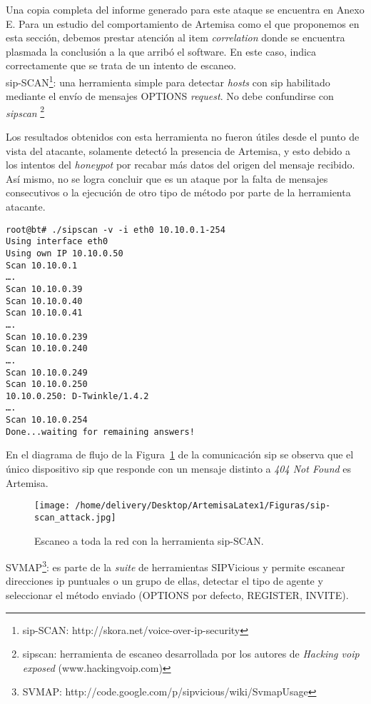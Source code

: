 \documentclass[a4paper,12pt]{report}
\newenvironment{myscriptlisting}
{\begin{list}{}{\setlength{\leftmargin}{1em}}\item\scriptsize\bfseries}
{\end{list}}
\begin{document}
 Una copia completa del informe generado para este ataque se encuentra en
 Anexo E.
Para un estudio del comportamiento de Artemisa como el que proponemos en esta 
sección, debemos prestar atención al item \emph{correlation} donde se
encuentra plasmada la conclusión a la que arribó el software.
En este caso, indica correctamente que se trata de un intento de escaneo.\\

\ac{sip}-SCAN\footnote{\ac{sip}-SCAN:
http://skora.net/voice-over-ip-security}: una herramienta simple para detectar \emph{hosts} con \ac{sip}
habilitado mediante el envío de mensajes OPTIONS \emph{request}. No debe confundirse con
\emph{sipscan} \footnote{sipscan: herramienta de escaneo desarrollada por los autores de \emph{Hacking \ac{voip}
exposed} (www.hackingvoip.com)}

Los resultados obtenidos con esta herramienta no fueron útiles desde el punto de
 vista del atacante, solamente detectó la presencia de Artemisa, y esto debido a
los intentos del \emph{honeypot} por recabar más datos del origen del mensaje recibido.
Así mismo, no se logra concluir que es un ataque por la falta de mensajes
consecutivos o la ejecución de otro tipo de método por parte de la herramienta
atacante. 

\begin{myscriptlisting}
 \begin{verbatim}
root@bt# ./sipscan -v -i eth0 10.10.0.1-254
Using interface eth0
Using own IP 10.10.0.50
Scan 10.10.0.1
….
Scan 10.10.0.39
Scan 10.10.0.40
Scan 10.10.0.41
….
Scan 10.10.0.239
Scan 10.10.0.240
….
Scan 10.10.0.249
Scan 10.10.0.250
10.10.0.250: D-Twinkle/1.4.2
….
Scan 10.10.0.254
Done...waiting for remaining answers!

 \end{verbatim}
\end{myscriptlisting}

En el diagrama de flujo de la Figura~\ref{escaneo_sipscan} de la comunicación \ac{sip} se observa que el único 
dispositivo \ac{sip} que responde con un mensaje distinto a  \emph{404 Not Found} es
Artemisa.

\begin{figure}[h!] 
\centering
\texttt{[image: /home/delivery/Desktop/ArtemisaLatex1/Figuras/sip-scan\_attack.jpg]}
\caption{Escaneo a toda la red con la herramienta \ac{sip}-SCAN.}
\label{escaneo_sipscan}
\end{figure}


SVMAP\footnote{SVMAP: http://code.google.com/p/sipvicious/wiki/SvmapUsage}: es parte de la \emph{suite} de herramientas SIPVicious
y permite escanear
 direcciones \ac{ip} puntuales o un grupo de ellas, detectar el tipo de agente y
seleccionar el método enviado (OPTIONS por defecto, REGISTER,
INVITE).
\end{document}
